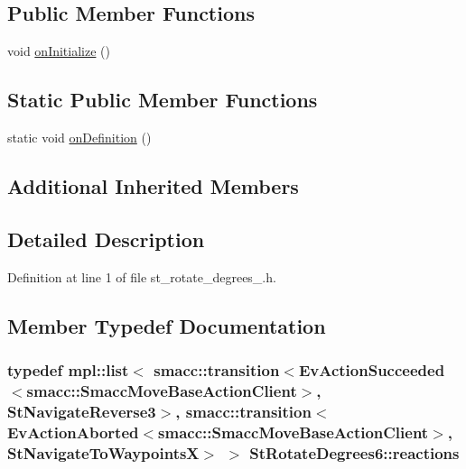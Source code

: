 \subsection*{Public Member Functions}
\begin{DoxyCompactItemize}
\item 
void \hyperlink{structStRotateDegrees6_ad83461ae95f2862d684609df5713d980}{on\+Initialize} ()
\end{DoxyCompactItemize}
\subsection*{Static Public Member Functions}
\begin{DoxyCompactItemize}
\item 
static void \hyperlink{structStRotateDegrees6_a939a41c05578dc4495d2ac05adf21cf0}{on\+Definition} ()
\end{DoxyCompactItemize}
\subsection*{Additional Inherited Members}


\subsection{Detailed Description}


Definition at line 1 of file st\+\_\+rotate\+\_\+degrees\+\_.\+h.



\subsection{Member Typedef Documentation}
\subsubsection[{\texorpdfstring{reactions}{reactions}}]{\setlength{\rightskip}{0pt plus 5cm}typedef mpl\+::list$<$ {\bf smacc\+::transition}$<$Ev\+Action\+Succeeded$<${\bf smacc\+::\+Smacc\+Move\+Base\+Action\+Client}$>$, {\bf St\+Navigate\+Reverse3}$>$, {\bf smacc\+::transition}$<$Ev\+Action\+Aborted$<${\bf smacc\+::\+Smacc\+Move\+Base\+Action\+Client}$>$, {\bf St\+Navigate\+To\+WaypointsX}$>$ $>$ {\bf St\+Rotate\+Degrees6\+::reactions}}\hypertarget{structStRotateDegrees6_ab6e035aae7342956c8ec0f0b2bc3d9cf}{}\label{structStRotateDegrees6_ab6e035aae7342956c8ec0f0b2bc3d9cf}


